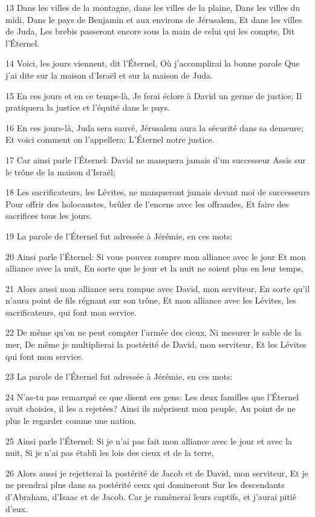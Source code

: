 \par 13 Dans les villes de la montagne, dans les villes de la plaine, Dans les villes du midi, Dans le pays de Benjamin et aux environs de Jérusalem, Et dans les villes de Juda, Les brebis passeront encore sous la main de celui qui les compte, Dit l'Éternel.
\par 14 Voici, les jours viennent, dit l'Éternel, Où j'accomplirai la bonne parole Que j'ai dite sur la maison d'Israël et sur la maison de Juda.
\par 15 En ces jours et en ce temps-là, Je ferai éclore à David un germe de justice; Il pratiquera la justice et l'équité dans le pays.
\par 16 En ces jours-là, Juda sera sauvé, Jérusalem aura la sécurité dans sa demeure; Et voici comment on l'appellera: L'Éternel notre justice.
\par 17 Car ainsi parle l'Éternel: David ne manquera jamais d'un successeur Assis sur le trône de la maison d'Israël;
\par 18 Les sacrificateurs, les Lévites, ne manqueront jamais devant moi de successeurs Pour offrir des holocaustes, brûler de l'encens avec les offrandes, Et faire des sacrifices tous les jours.
\par 19 La parole de l'Éternel fut adressée à Jérémie, en ces mots:
\par 20 Ainsi parle l'Éternel: Si vous pouvez rompre mon alliance avec le jour Et mon alliance avec la nuit, En sorte que le jour et la nuit ne soient plus en leur temps,
\par 21 Alors aussi mon alliance sera rompue avec David, mon serviteur, En sorte qu'il n'aura point de fils régnant sur son trône, Et mon alliance avec les Lévites, les sacrificateurs, qui font mon service.
\par 22 De même qu'on ne peut compter l'armée des cieux, Ni mesurer le sable de la mer, De même je multiplierai la postérité de David, mon serviteur, Et les Lévites qui font mon service.
\par 23 La parole de l'Éternel fut adressée à Jérémie, en ces mots:
\par 24 N'as-tu pas remarqué ce que disent ces gens: Les deux familles que l'Éternel avait choisies, il les a rejetées? Ainsi ils méprisent mon peuple, Au point de ne plus le regarder comme une nation.
\par 25 Ainsi parle l'Éternel: Si je n'ai pas fait mon alliance avec le jour et avec la nuit, Si je n'ai pas établi les lois des cieux et de la terre,
\par 26 Alors aussi je rejetterai la postérité de Jacob et de David, mon serviteur, Et je ne prendrai plus dans sa postérité ceux qui domineront Sur les descendants d'Abraham, d'Isaac et de Jacob. Car je ramènerai leurs captifs, et j'aurai pitié d'eux.

